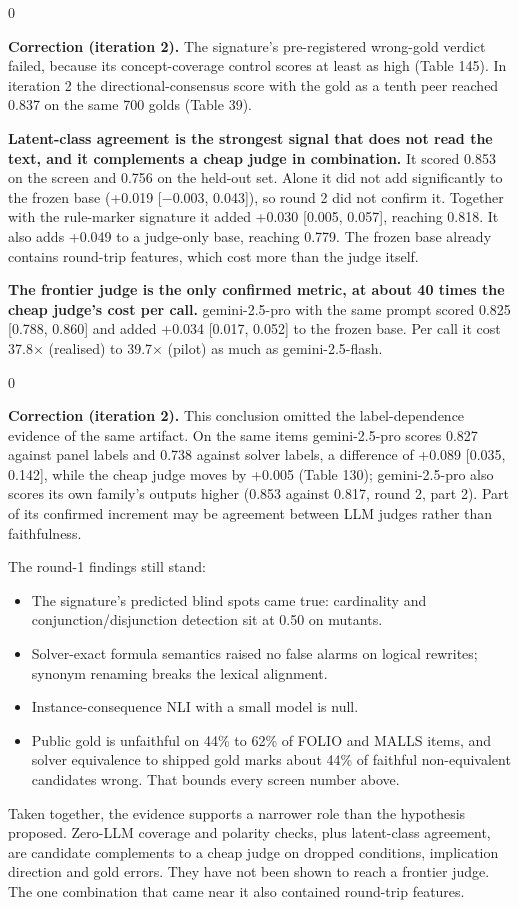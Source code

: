 \documentclass[11pt,letterpaper]{article}
\newenvironment{correction}{\par\medskip\noindent\begin{minipage}{\linewidth}\setlength{\fboxsep}{6pt}\begin{lrbox}{0}\begin{minipage}{0.96\linewidth}\small}{\end{minipage}\end{lrbox}\colorbox{black!6}{\usebox{0}}\end{minipage}\par\medskip}
\begin{document}
\begin{correction}\textbf{Correction (iteration 2).} The signature's pre-registered wrong-gold verdict failed, because its concept-coverage control scores at least as high (Table 145). In iteration 2 the directional-consensus score with the gold as a tenth peer reached 0.837 on the same 700 golds (Table 39).\end{correction}

\textbf{Latent-class agreement is the strongest signal that does not read the text, and it complements a cheap judge in combination.} It scored 0.853 on the screen and 0.756 on the held-out set. Alone it did not add significantly to the frozen base (+0.019 [$-$0.003, 0.043]), so round 2 did not confirm it. Together with the rule-marker signature it added +0.030 [0.005, 0.057], reaching 0.818. It also adds +0.049 to a judge-only base, reaching 0.779. The frozen base already contains round-trip features, which cost more than the judge itself.

\textbf{The frontier judge is the only confirmed metric, at about 40 times the cheap judge's cost per call.} gemini-2.5-pro with the same prompt scored 0.825 [0.788, 0.860] and added +0.034 [0.017, 0.052] to the frozen base. Per call it cost 37.8$\times$ (realised) to 39.7$\times$ (pilot) as much as gemini-2.5-flash.

\begin{correction}\textbf{Correction (iteration 2).} This conclusion omitted the label-dependence evidence of the same artifact. On the same items gemini-2.5-pro scores 0.827 against panel labels and 0.738 against solver labels, a difference of +0.089 [0.035, 0.142], while the cheap judge moves by +0.005 (Table 130); gemini-2.5-pro also scores its own family's outputs higher (0.853 against 0.817, round 2, part 2). Part of its confirmed increment may be agreement between LLM judges rather than faithfulness.\end{correction}

The round-1 findings still stand:

\begin{itemize}
\item {}The signature's predicted blind spots came true: cardinality and conjunction/disjunction detection sit at 0.50 on mutants.
\item {}Solver-exact formula semantics raised no false alarms on logical rewrites; synonym renaming breaks the lexical alignment.
\item {}Instance-consequence NLI with a small model is null.
\item {}Public gold is unfaithful on 44\% to 62\% of FOLIO and MALLS items, and solver equivalence to shipped gold marks about 44\% of faithful non-equivalent candidates wrong. That bounds every screen number above.
\end{itemize}
Taken together, the evidence supports a narrower role than the hypothesis proposed. Zero-LLM coverage and polarity checks, plus latent-class agreement, are candidate complements to a cheap judge on dropped conditions, implication direction and gold errors. They have not been shown to reach a frontier judge. The one combination that came near it also contained round-trip features.
\end{document}
